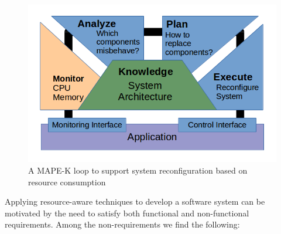 \begin{figure}[!h]
\centering
\includegraphics[scale=0.65]{./chapter1/fig/mape-k.png}
\caption{A MAPE-K loop to support system reconfiguration based on resource consumption} \label{fig:resource-aware-vs-autonomic-computing}
\end{figure}

Applying resource-aware techniques to develop a software system can be motivated by the need to satisfy both functional and non-functional requirements.
Among the non-requirements we find the following:

